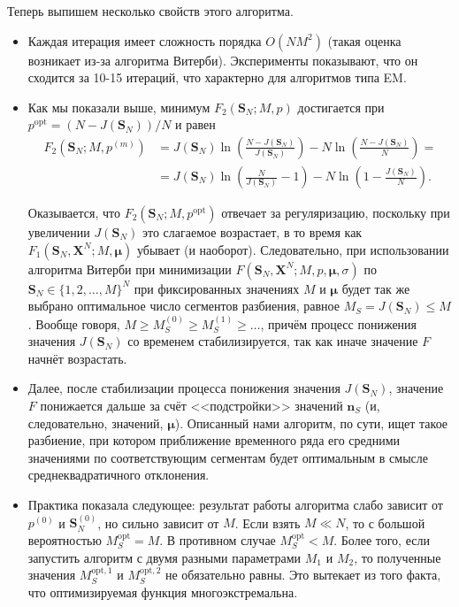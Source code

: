 Теперь выпишем несколько свойств этого алгоритма.
\begin{itemize}
	\item Каждая итерация имеет сложность порядка \(O(NM^{2})\) (такая оценка 
	возникает из-за алгоритма Витерби). Эксперименты показывают, что он 
	сходится за 10-15 итераций, что характерно для алгоритмов типа EM.
	\item Как мы показали выше, минимум \(F_{2}(\mathbf{S}_{N}; M, p)\) 
	достигается при \(p^{\mathrm{opt}} = (N - J(\mathbf{S}_{N}))/N\) и равен
	\begin{align*}
		F_{2}(\mathbf{S}_{N}; M, p^{(m)}) &= 
		J(\mathbf{S}_{N})\ln\left(\frac{N - J(\mathbf{S}_{N})} 
		{J(\mathbf{S}_{N})}\right) - N\ln\left(\frac{N - J(\mathbf{S}_{N})} 
		{N}\right) = \\
		&= J(\mathbf{S}_{N})\ln\left(\frac{N} {J(\mathbf{S}_{N})} - 
		1\right) - N\ln\left(1 - \frac{J(\mathbf{S}_{N})}{N}\right).
	\end{align*}
	
	Оказывается, что \(F_{2}(\mathbf{S}_{N}; M, p^{\mathrm{opt}})\) отвечает за 
	регуляризацию, поскольку при увеличении \(J(\mathbf{S}_{N})\) это слагаемое 
	возрастает, в то время как \(F_{1}(\mathbf{S}_{N}, \mathbf{X}^{N}; M, 
	\bm{\mu})\) убывает (и наоборот). Следовательно, при использовании 
	алгоритма Витерби при минимизации \(F(\mathbf{S}_{N}, \mathbf{X}^{N}; M, p, 
	\bm{\mu}, \sigma)\) по \(\mathbf{S}_{N} \in \{1, 2, \ldots, M\}^{N}\) при 
	фиксированных значениях \(M\) и \(\bm{\mu}\) будет так же выбрано 
	оптимальное число сегментов разбиения, равное \(M_{S} = J(\mathbf{S}_{N}) 
	\leq M\). Вообще говоря, \(M \geq M_{S}^{(0)} \geq M_{S}^{(1)} \geq 
	\ldots\), причём процесс понижения значения \(J(\mathbf{S}_{N})\) со 
	временем стабилизируется, так как иначе значение \(F\) начнёт возрастать.
	
	\item Далее, после стабилизации процесса понижения значения 
	\(J(\mathbf{S}_{N})\), значение \(F\) понижается дальше за счёт 
	<<подстройки>> значений \(\mathbf{n}_{S}\) (и, следовательно, значений, 
	\(\bm{\mu}\)). Описанный нами алгоритм, по сути, ищет такое разбиение, при 
	котором приближение временного ряда его средними значениями по 
	соответствующим сегментам будет оптимальным в смысле среднеквадратичного 
	отклонения.
	
	\item Практика показала следующее: результат работы алгоритма слабо зависит 
	от \(p^{(0)}\) и \(\mathbf{S}_{N}^{(0)}\), но сильно зависит от \(M\). Если 
	взять \(M \ll N\), то с большой вероятностью \(M_{S}^{\mathrm{opt}} = M\). 
	В противном случае \(M_{S}^{\mathrm{opt}} < M\). Более того, если запустить 
	алгоритм с двумя разными параметрами \(M_{1}\) и \(M_{2}\), то полученные 
	значения \(M_{S}^{\mathrm{opt}, 1}\) и \(M_{S}^{\mathrm{opt}, 2}\) не 
	обязательно равны. Это вытекает из того факта, что оптимизируемая функция 
	многоэкстремальна.
\end{itemize}